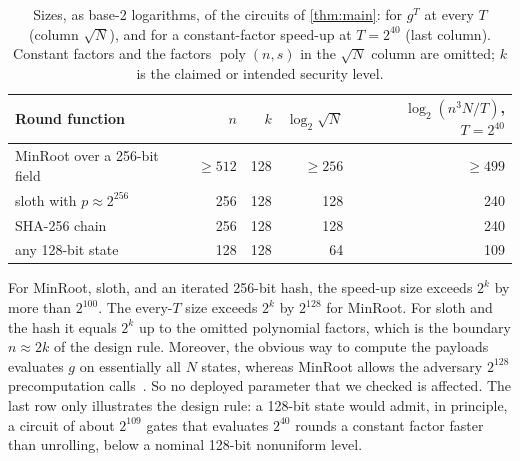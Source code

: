 \documentclass[11pt]{article}
\theoremstyle{definition}
\theoremstyle{remark}
\newcommand{\poly}{\operatorname{poly}}
\numberwithin{equation}{section}
\begin{document}
\begin{table}[htbp]
\centering
\small
\begin{tabular}{@{}lrrrr@{}}
\toprule
Round function & $n$ & $k$ & $\log_2\sqrt N$ & $\log_2(n^3N/T)$, $T=2^{40}$ \\
\midrule
MinRoot over a 256-bit field & $\geq512$ & 128 & $\geq256$ & $\geq499$ \\
sloth with $p\approx2^{256}$ & 256 & 128 & 128 & 240 \\
SHA-256 chain & 256 & 128 & 128 & 240 \\
any 128-bit state & 128 & 128 & 64 & 109 \\
\bottomrule
\end{tabular}
\caption{Sizes, as base-2 logarithms, of the circuits of \cref{thm:main}:
for $g^T$ at every $T$ (column $\sqrt N$), and for a constant-factor
speed-up at $T=2^{40}$ (last column).  Constant factors and the factors
$\poly(n,s)$ in the $\sqrt N$ column are omitted; $k$ is the claimed or
intended security level.}
\label{tab:crypto}
\end{table}

For MinRoot, sloth, and an iterated 256-bit hash, the speed-up size exceeds
$2^{k}$ by more than $2^{100}$.  The every-$T$ size exceeds $2^k$ by
$2^{128}$ for MinRoot.  For sloth and the hash it equals $2^k$ up to the
omitted polynomial factors, which is the boundary $n\approx2k$ of the
design rule.  Moreover, the obvious way to compute the
payloads evaluates $g$ on essentially all $N$ states, whereas MinRoot
allows the adversary $2^{128}$ precomputation calls~\cite{KMT22}.  So no
deployed parameter that we checked is affected.  The last row only
illustrates the design rule: a 128-bit state would admit, in principle,
a circuit of about $2^{109}$ gates that evaluates $2^{40}$ rounds a constant
factor faster than unrolling, below a nominal 128-bit nonuniform level.
\end{document}
